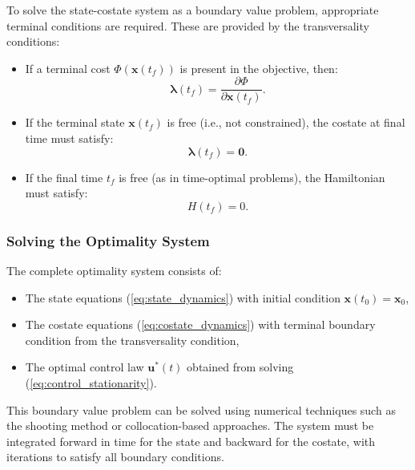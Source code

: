 To solve the state-costate system as a boundary value problem, appropriate terminal conditions are required. These are provided by the transversality conditions:

\begin{itemize}
    \item If a terminal cost \( \Phi(\mathbf{x}(t_f)) \) is present in the objective, then:
    \begin{equation} \label{eq:costate_boundary}
    \boldsymbol{\lambda}(t_f) = \frac{\partial \Phi}{\partial \mathbf{x}(t_f)}.
    \end{equation}
    
    \item If the terminal state \( \mathbf{x}(t_f) \) is free (i.e., not constrained), the costate at final time must satisfy:
    \begin{equation} \label{eq:free_terminal_state}
    \boldsymbol{\lambda}(t_f) = \mathbf{0}.
    \end{equation}
    
    \item If the final time \( t_f \) is free (as in time-optimal problems), the Hamiltonian must satisfy:
    \begin{equation} \label{eq:free_final_time}
    H(t_f) = 0.
    \end{equation}
\end{itemize}

\subsubsection*{Solving the Optimality System}

The complete optimality system consists of:
\begin{itemize}
    \item The state equations (\ref{eq:state_dynamics}) with initial condition \( \mathbf{x}(t_0) = \mathbf{x}_0 \),
    \item The costate equations (\ref{eq:costate_dynamics}) with terminal boundary condition from the transversality condition,
    \item The optimal control law \( \mathbf{u}^*(t) \) obtained from solving (\ref{eq:control_stationarity}).
\end{itemize}

This boundary value problem can be solved using numerical techniques such as the shooting method or collocation-based approaches. The system must be integrated forward in time for the state and backward for the costate, with iterations to satisfy all boundary conditions.


